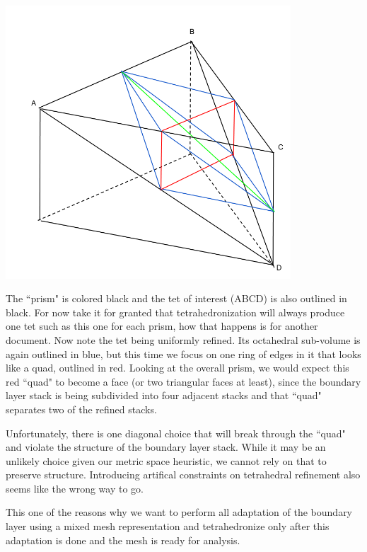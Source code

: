 \documentclass{article}
\begin{document}
\includegraphics[width=0.8\textwidth]{prism_uniform_refine.png}

The ``prism" is colored black and the tet of interest (ABCD) is also outlined in black.
For now take it for granted that tetrahedronization will always produce one
tet such as this one for each prism, how that happens is for another document.
Now note the tet being uniformly refined.
Its octahedral sub-volume is again outlined in blue, but this time we focus
on one ring of edges in it that looks like a quad, outlined in red.
Looking at the overall prism, we would expect this red ``quad" to become a face
(or two triangular faces at least), since the boundary layer stack is being
subdivided into four adjacent stacks and that ``quad" separates two of the refined
stacks.

Unfortunately, there is one diagonal choice that will break through the ``quad"
and violate the structure of the boundary layer stack.
While it may be an unlikely choice given our metric space heuristic, we cannot
rely on that to preserve structure.
Introducing artifical constraints on tetrahedral refinement also seems like
the wrong way to go.

This one of the reasons why we want to perform all adaptation of
the boundary layer using a mixed mesh representation and tetrahedronize only
after this adaptation is done and the mesh is ready for analysis.
\end{document}
